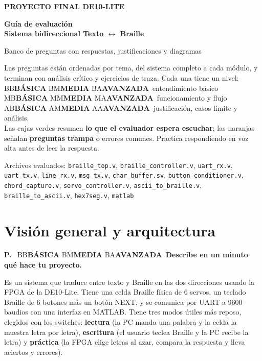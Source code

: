 \documentclass[11pt,a4paper]{article}
\newcounter{preg}
\newcommand{\nivel}[1]{%
  \ifx#1B\colorbox{verdesuave}{\textcolor{verde}{\scriptsize\bfseries BÁSICA}}\fi
  \ifx#1M\colorbox{ambarsuave}{\textcolor{ambar}{\scriptsize\bfseries MEDIA}}\fi
  \ifx#1A\colorbox{rojosuave}{\textcolor{rojo}{\scriptsize\bfseries AVANZADA}}\fi}
\newcommand{\preg}[2]{\refstepcounter{preg}\par\vspace{0.9em}\noindent
  {\color{tinta}\bfseries P\thepreg.}~\nivel{#1}~\textbf{#2}\par\vspace{0.3em}}
\newcommand{\cod}[1]{\texttt{#1}}
\begin{document}
\begin{titlepage}
\centering
\vspace*{2.5cm}
{\color{verde}\large\bfseries PROYECTO FINAL \textendash{} DE10-LITE\par}
\vspace{0.6cm}
{\color{tinta}\Huge\bfseries Guía de evaluación\\[0.2cm]\LARGE Sistema bidireccional Texto $\leftrightarrow$ Braille\par}
\vspace{0.6cm}
{\large\color{gris}Banco de preguntas con respuestas, justificaciones y diagramas\par}
\vspace{1.4cm}
\begin{minipage}{0.82\textwidth}
\begin{clave}
Las preguntas están ordenadas por tema, del sistema completo a cada módulo, y
terminan con análisis crítico y ejercicios de traza. Cada una tiene un nivel:\\[3pt]
\nivel{B}\ entendimiento básico \quad \nivel{M}\ funcionamiento y flujo \quad \nivel{A}\ justificación, casos límite y análisis.\\[3pt]
Las cajas verdes resumen \textbf{lo que el evaluador espera escuchar}; las naranjas
señalan \textbf{preguntas trampa} o errores comunes. Practica respondiendo en voz
alta antes de leer la respuesta.
\end{clave}
\end{minipage}
\vfill
{\color{gris}Archivos evaluados: \cod{braille\_top.v}, \cod{braille\_controller.v}, \cod{uart\_rx.v}, \cod{uart\_tx.v},
\cod{line\_rx.v}, \cod{msg\_tx.v}, \cod{char\_buffer.sv}, \cod{button\_conditioner.v}, \cod{chord\_capture.v},
\cod{servo\_controller.v}, \cod{ascii\_to\_braille.v}, \cod{braille\_to\_ascii.v}, \cod{hex7seg.v}, \cod{matlab}\par}
\end{titlepage}

\tableofcontents
\newpage

\section{Visión general y arquitectura}

\preg{B}{Describe en un minuto qué hace tu proyecto.}
\begin{resp}
Es un sistema que traduce entre texto y Braille en las dos direcciones usando la
FPGA de la DE10-Lite. Tiene una celda Braille física de 6 servos, un teclado
Braille de 6 botones más un botón NEXT, y se comunica por UART a 9600 baudios con
una interfaz en MATLAB. Tiene tres modos útiles más reposo, elegidos con los
switches: \textbf{lectura} (la PC manda una palabra y la celda la muestra letra
por letra), \textbf{escritura} (el usuario teclea Braille y la PC recibe la
letra) y \textbf{práctica} (la FPGA elige letras al azar, compara la respuesta y
lleva aciertos y errores).
\end{resp}
\end{document}
